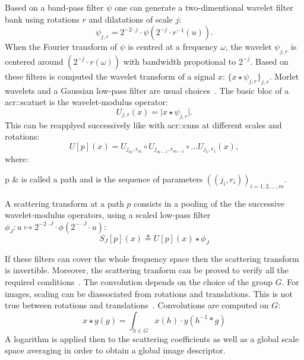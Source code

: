             Based on a band-pass filter $\psi$ one can generate a two-dimentional wavelet filter bank using rotations $r$ and dilatations of scale $j$:
            \begin{equation}
                \label{eq::filter_bank}
                \psi_{j,r} = 2^{-2\cdot j}\cdot\psi\left(2^{-j}\cdot r^{-1}(u)\right).
            \end{equation}
            When the Fourier transform of $\psi$ is centred at a frequency $\omega$, the wavelet $\psi_{j,r}$ is centered around $\left(2^{-j}\cdot r(\omega)\right)$ with bandwidth propotional to $2^{-j}$.
            Based on these filters is computed the wavelet transform of a signal $x$: $\{x\star\psi_{j,r}\}_{j,r}$.
            Morlet wavelets and a Gaussian low-pass filter are usual choices~\parencite{bruna2013invariant,sifre2013rotation}.
            The basic bloc of a \gls{acr::scatnet} is the wavelet-modulus operator:
            \begin{equation}
                \label{eq::basic_operator}
                U_{j,r}(x) = \vert x\star\psi_{j,r} \vert.
            \end{equation}
            This can be reapplyed successively like with \glspl{acr::cnn} at different scales and rotations:
            \begin{equation}
                \label{eq::basic_operator}
                U[p](x) = U_{j_m,r_m}\circ U_{j_{m-1},r_{m-1}} \circ \dots U_{j_1,r_1} (x),
            \end{equation}
            where:
            \begin{conditions}
                p & is called a path and is the sequence of parameters $\left((j_i, r_i)\right)_{i=1,2,\dots,m}$.
            \end{conditions}
            A scattering transform at a path $p$ consists in a pooling of the the successive wavelet-modulus operators, using a scaled low-pass filter $\phi_J: u\mapsto 2^{-2\cdot J}\cdot\phi\left(2^{-\cdot J}\cdot u\right)$:
            \begin{equation}
                \label{eq::scattering_transform}
                S_J[p](x) \triangleq U[p](x) \star \phi_J
            \end{equation}

            If these filters can cover the whole frequency space then the scattering transform is invertible.
            Moreover, the scattering tranform can be proved to verify all the required conditions~\parencite{mallat2012group}.
            The convolution depends on the choice of the group $G$.
            For images, scaling can be diassociated from rotations and translations.
            This is not true between rotations and translations~\parencite{sifre2013rotation,oyallon2015deep}.
            Convolutions are computed on $G$:
            \begin{equation}
                \label{eq::group_convolution}
                x\star y(g) = \int_{h\in G} x(h)\cdot y(h^{-1}*g)
            \end{equation}
            A logarithm is applied then to the scattering coefficients as well as a global scale space averaging in order to obtain a global image descriptor.

